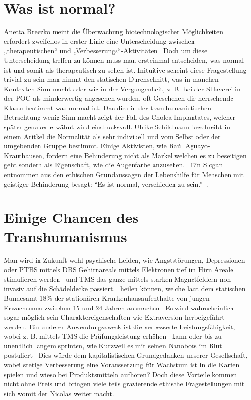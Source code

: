 \documentclass[a4paper,
DIV=13,
12pt,
BCOR=10mm,
department=FakEI,
twoside,
parskip=half,
automark,
]{OTHRartcl}
\begin{document}
\section*{Was ist normal?}
Anetta Breczko meint die Überwachung biotechnologischer Möglichkeiten erfordert zweifellos in erster Linie eine Unterscheidung zwischen „therapeutischen“ und „Verbesserungs“-Aktivitäten~\cite{breczko2021human}
Doch um diese Unterscheidung treffen zu können muss man ersteinmal entscheiden, was normal ist und somit als therapeutisch zu sehen ist. Inituitive scheint diese Fragestellung trivial zu sein
man nimmt den statischen Durchschnitt, was in manchen Kontexten Sinn macht oder wie in der Vergangenheit, z. B. bei der Sklaverei in der POC als minderwertig angesehen wurden, oft Geschehen die herrschende Klasse
bestimmt was normal ist. Das dies in der transhumanistischen Betrachtung wenig Sinn macht zeigt der Fall des Cholea-Implantates, welcher später genauer erwähnt wird eindrucksvoll. Ulrike Schildmann beschreibt in einem 
Aritkel die Normalität als sehr indiviuell und vom Selbst oder der umgebenden Gruppe bestimmt.\cite{schildmann1999normal} Einige Aktivisten, wie Raúl Aguayo-Krauthausen, fordern
eine Behinderung nicht als Markel welchen es zu beseitigen geht sondern als Eigenschaft, wie die Augenfarbe anzusehen.~\cite{aguayo2023inklusion} Ein Slogan entnommen aus den ethischen Grundaussagen der Lebenshilfe
für Menschen mit geistiger Behinderung besagt: ``Es ist normal, verschieden zu sein.''~\cite{lebenshilfeFlyer}.

\section*{Einige Chancen des Transhumanismus}
Man wird in Zukunft wohl psychische Leiden, wie Angststörungen, Depressionen oder PTBS mittels DBS Gehirnareale mittels Elektronen tief im Hirn Areale stimulieren werden~\cite{perlmutter2006deep} und TMS das ganze mittels starken
Magnetfeldern non invasiv auf die Schädeldecke passiert.~\cite{hallett2007transcranial} heilen können, welche laut dem statischen Bundesamt 18\% der stationären Krankenhausaufenthalte von jungen Erwachsenen zwischen 15 und 24 Jahren
ausmachen~\cite{destatis2022} Es wird wahrscheinlich sogar möglich sein Charaktereigenschaften wie Extraversion herbeigeführt werden. Ein anderer Anwendungszweck ist die verbesserte Leistungsfähigkeit, wobei z. B. mittels TMS die
Prüfungsleistung erhöhen~\cite{luber2014enhancement} kann oder bis zu unendlich langem sprinten, wie Kurzweil es mit seinen Nanobots im Blut postuliert~\cite{kurzweil2005singularity} Dies würde dem kapitalistischen Grundgedanken
unserer Gesellschaft, wobei stetige Verbesserung eine Voraussetzung für Wachstum ist in die Karten spielen und wieso bei Produktsmitteln aufhören? Doch diese Vorteile kommen nicht ohne Preis und bringen viele teils gravierende
ethische Fragestellungen mit sich womit der Nicolas weiter macht.
\end{document}

